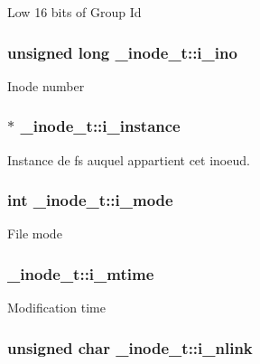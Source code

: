 Low 16 bits of Group Id \hypertarget{struct__inode__t_aba602b843ba63a32ca3950dbaf7e959c}{
\subsubsection[{i\-\_\-ino}]{\setlength{\rightskip}{0pt plus 5cm}unsigned long \-\_\-inode\-\_\-t\-::i\-\_\-ino}}\label{struct__inode__t_aba602b843ba63a32ca3950dbaf7e959c}
Inode number \hypertarget{struct__inode__t_affefc88b22f45e2ec8340d582486d0f2}{
\subsubsection[{i\-\_\-instance}]{$\ast$ \-\_\-inode\-\_\-t\-::i\-\_\-instance}}\label{struct__inode__t_affefc88b22f45e2ec8340d582486d0f2}
Instance de fs auquel appartient cet inoeud. \hypertarget{struct__inode__t_acead4732b6c22ef17ada59203509e728}{
\subsubsection[{i\-\_\-mode}]{\setlength{\rightskip}{0pt plus 5cm}int \-\_\-inode\-\_\-t\-::i\-\_\-mode}}\label{struct__inode__t_acead4732b6c22ef17ada59203509e728}
File mode \hypertarget{struct__inode__t_a331d724391efce2f89aeb1a503ae5c43}{
\subsubsection[{i\-\_\-mtime}]{ \-\_\-inode\-\_\-t\-::i\-\_\-mtime}}\label{struct__inode__t_a331d724391efce2f89aeb1a503ae5c43}
Modification time \hypertarget{struct__inode__t_a929fc1e6837d02a2525027a121b4e67e}{
\subsubsection[{i\-\_\-nlink}]{\setlength{\rightskip}{0pt plus 5cm}unsigned char \-\_\-inode\-\_\-t\-::i\-\_\-nlink}}\label{struct__inode__t_a929fc1e6837d02a2525027a121b4e67e}
